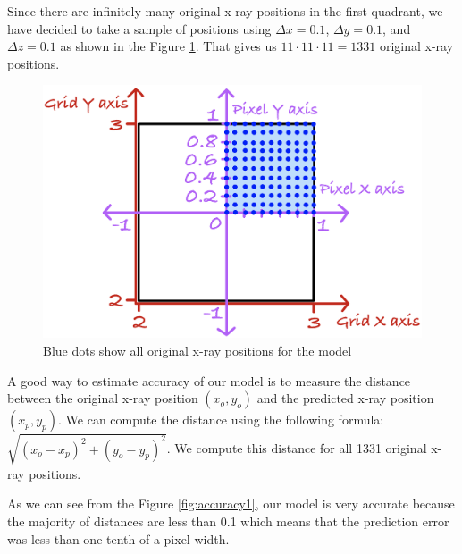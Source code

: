 \documentclass{article}
\begin{document}
Since there are infinitely many original x-ray positions in the first quadrant, we have decided to take a sample of positions using $\Delta x = 0.1$, $\Delta y = 0.1$, and $\Delta z = 0.1$ as shown in the Figure \ref{fig:positions}. That gives us $11\cdot 11\cdot 11 = 1331$ original x-ray positions.

\begin{figure}[H]
    \centering
    \includegraphics[width=0.7\linewidth]{images/positions.png}
    \caption{Blue dots show all original x-ray positions for the model}
    \label{fig:positions}
\end{figure}

A good way to estimate accuracy of our model is to measure the distance between the original x-ray position $(x_o,y_o)$ and the predicted x-ray position $(x_p, y_p)$. We can compute the distance using the following formula: $\sqrt{(x_o-x_p)^2 + (y_o-y_p)^2}$. We compute this distance for all 1331 original x-ray positions.

As we can see from the Figure \ref{fig:accuracy1}, our model is very accurate because the majority of distances are less than 0.1 which means that the prediction error was less than one tenth of a pixel width. 
\end{document}
